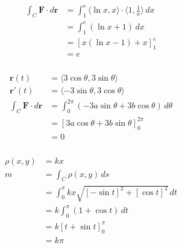 \documentclass{article}
\begin{document}
\setcounter{subsubsection}{30}
\subsubsection{}

\begin{align*}
  \int_C \mathbf{F} \cdot d \mathbf{r} & = \int_1^e \langle \ln x, x \rangle \cdot \langle 1, \frac{1}{x} \rangle \,dx \\
                                       & = \int_1^e (\ln x + 1) \,dx                                                   \\
                                       & = [x (\ln x - 1) + x]_1^e                                                     \\
                                       & = e
\end{align*}

\setcounter{subsubsection}{34}
\subsubsection{}

\begin{align*}
  \mathbf{r}(t)                        & = \langle 3 \cos \theta, 3 \sin \theta \rangle                   \\
  \mathbf{r}'(t)                       & = \langle -3 \sin \theta, 3 \cos \theta \rangle                  \\
  \int_C \mathbf{F} \cdot d \mathbf{r} & = \int_0^{2 \pi} (-3 a \sin \theta + 3 b \cos \theta) \,d \theta \\
                                       & = [3 a \cos \theta + 3 b \sin \theta]_0^{2 \pi}                  \\
                                       & = 0
\end{align*}

\setcounter{subsubsection}{39}
\subsubsection{}

\begin{align*}
  \rho(x, y) & = k x                                                \\
  m          & = \int_C \rho(x, y) \,ds                             \\
             & = \int_0^\pi k x \sqrt{[-\sin t]^2 +[\cos t]^2} \,dt \\
             & = k \int_0^\pi (1 + \cos t) \,dt                     \\
             & = k [t + \sin t]_0^\pi                               \\
             & = k \pi
\end{align*}
\end{document}
